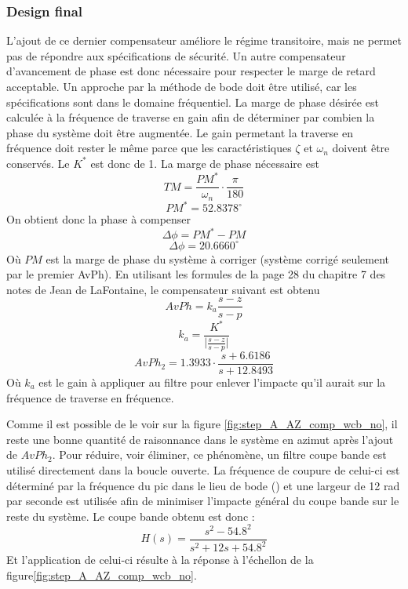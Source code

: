 \documentclass{udes_rapport} %
\begin{document}
\subsubsection{Design final}

L'ajout de ce dernier compensateur améliore le régime transitoire, mais ne permet pas de répondre aux spécifications de sécurité. Un autre compensateur d'avancement de phase est donc nécessaire pour respecter le marge de retard acceptable. Un approche par la méthode de bode doit être utilisé, car les spécifications sont dans le domaine fréquentiel. La marge de phase désirée est calculée à la fréquence de traverse en gain afin de déterminer par combien la phase du système doit être augmentée. Le gain permetant la traverse en fréquence doit rester le même parce que les caractéristiques $\zeta$ et $\omega _{n}$ doivent être conservés. Le $K^*$ est donc de 1.
La marge de phase nécessaire est 
\[ TM = \frac{PM^*}{\omega_n}\cdot\frac{\pi}{180}\]
\[PM^* = 52.8378^\circ\]
On obtient donc la phase à compenser
\[\Delta \phi = PM^* - PM \]
\[\Delta \phi = 20.6660^\circ\]
Où $PM$ est la marge de phase du système à corriger (système corrigé seulement par le premier AvPh). En utilisant les formules de la page 28 du chapitre 7 des notes de Jean de LaFontaine, le compensateur suivant est obtenu
\[AvPh = k_a\frac{s-z}{s-p}\]
\[k_a = \frac{K^*}{\vert \frac{s-z}{s-p} \vert}\]
\[ AvPh_2 =  1.3933 \cdot \frac{s+6.6186}{s+12.8493}\]
Où $k_a$ est le gain à appliquer au filtre pour enlever l'impacte qu'il aurait sur la fréquence de traverse en fréquence.

Comme il est possible de le voir sur la figure \ref{fig:step_A_AZ_comp_wcb_no}, il reste une bonne quantité de raisonnance dans le système en azimut après l'ajout de $  AvPh_2 $. Pour réduire, voir éliminer, ce phénomène, un filtre coupe bande est utilisé directement dans la boucle ouverte. La fréquence de coupure de celui-ci est déterminé par la fréquence du pic dans le lieu de bode () et une largeur de 12 rad par seconde est utilisée afin de minimiser l'impacte général du coupe bande sur le reste du système. Le coupe bande obtenu est donc :
\[H(s) = \frac{s^2 - 54.8^2}{s^2 + 12s + 54.8^2}\]
Et l'application de celui-ci résulte à la réponse à l'échellon de la figure\ref{fig:step_A_AZ_comp_wcb_no}.

\end{document}
